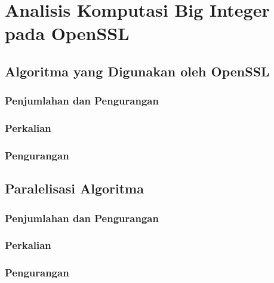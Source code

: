 \section{Analisis Komputasi Big Integer pada OpenSSL}

\subsection{Algoritma yang Digunakan oleh OpenSSL}
\subsubsection{Penjumlahan dan Pengurangan}
\subsubsection{Perkalian}
\subsubsection{Pengurangan}

\subsection{Paralelisasi Algoritma}
\subsubsection{Penjumlahan dan Pengurangan}
\subsubsection{Perkalian}
\subsubsection{Pengurangan}
